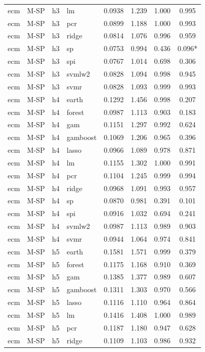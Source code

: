 \begin{ThreePartTable}
\begin{longtable}[t]{llclcccc}
ecm & M-SP & h3 & lm & 0.0938 & 1.239 & 1.000 & 0.995\\
ecm & M-SP & h3 & pcr & 0.0899 & 1.188 & 1.000 & 0.993\\
ecm & M-SP & h3 & ridge & 0.0814 & 1.076 & 0.996 & 0.959\\
ecm & M-SP & h3 & sp & 0.0753 & 0.994 & 0.436 & 0.096*\\
ecm & M-SP & h3 & spi & 0.0767 & 1.014 & 0.698 & 0.306\\
ecm & M-SP & h3 & svmlw2 & 0.0828 & 1.094 & 0.998 & 0.945\\
ecm & M-SP & h3 & svmr & 0.0828 & 1.093 & 0.999 & 0.993\\
\addlinespace
ecm & M-SP & h4 & earth & 0.1292 & 1.456 & 0.998 & 0.207\\
ecm & M-SP & h4 & forest & 0.0987 & 1.113 & 0.903 & 0.183\\
ecm & M-SP & h4 & gam & 0.1151 & 1.297 & 0.992 & 0.624\\
ecm & M-SP & h4 & gamboost & 0.1069 & 1.206 & 0.965 & 0.396\\
ecm & M-SP & h4 & lasso & 0.0966 & 1.089 & 0.978 & 0.871\\
ecm & M-SP & h4 & lm & 0.1155 & 1.302 & 1.000 & 0.991\\
ecm & M-SP & h4 & pcr & 0.1104 & 1.245 & 0.999 & 0.994\\
ecm & M-SP & h4 & ridge & 0.0968 & 1.091 & 0.993 & 0.957\\
ecm & M-SP & h4 & sp & 0.0870 & 0.981 & 0.391 & 0.101\\
ecm & M-SP & h4 & spi & 0.0916 & 1.032 & 0.694 & 0.241\\
ecm & M-SP & h4 & svmlw2 & 0.0987 & 1.113 & 0.989 & 0.903\\
ecm & M-SP & h4 & svmr & 0.0944 & 1.064 & 0.974 & 0.841\\
\addlinespace
ecm & M-SP & h5 & earth & 0.1581 & 1.571 & 0.999 & 0.379\\
ecm & M-SP & h5 & forest & 0.1175 & 1.168 & 0.910 & 0.369\\
ecm & M-SP & h5 & gam & 0.1385 & 1.377 & 0.989 & 0.607\\
ecm & M-SP & h5 & gamboost & 0.1311 & 1.303 & 0.970 & 0.566\\
ecm & M-SP & h5 & lasso & 0.1116 & 1.110 & 0.964 & 0.864\\
ecm & M-SP & h5 & lm & 0.1416 & 1.408 & 1.000 & 0.989\\
ecm & M-SP & h5 & pcr & 0.1187 & 1.180 & 0.947 & 0.628\\
ecm & M-SP & h5 & ridge & 0.1109 & 1.103 & 0.986 & 0.932\\

\end{longtable}
\end{ThreePartTable}
